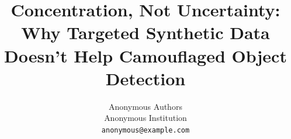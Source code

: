 \documentclass{article}
\title{Concentration, Not Uncertainty: Why Targeted Synthetic Data Doesn't Help Camouflaged Object Detection}
\author{Anonymous Authors \\
Anonymous Institution \\
\texttt{anonymous@example.com}
}
\begin{document}
\maketitle

\begin{abstract}
%


\end{abstract}
\end{document}
